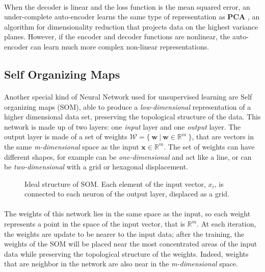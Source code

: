 \paragraph{}
When the decoder is linear and the loss function is the mean squared error, an under-complete auto-encoder learns the same type of representation as \textbf{PCA} \cite{PCA}, an algorithm for dimensionality reduction that projects data on the highest variance planes. However, if the encoder and decoder functions are nonlinear, the auto-encoder can learn much more complex non-linear representations.

\subsection{Self Organizing Maps}
\label{subsec:som}
\paragraph{}
Another special kind of Neural Network used for unsupervised learning are Self organizing maps \cite{som_paper} (SOM), able to produce a \textit{low-dimensional} representation of a higher dimensional data set, preserving the topological structure of the data. \newline
This network is made up of two layers: one \textit{input} layer and one \textit{output} layer. The output layer is made of a set of weights $\mathcal{W} = \{\ \textbf{w}\ |\ \textbf{w} \in \mathbb{R}^m\ \}$, that are vectors in the same \textit{m-dimensional} space as the input $\textbf{x} \in \mathbb{R}^m$.
The set of weights can have different shapes, for example can be \textit{one-dimensional} and act like a line, or can be \textit{two-dimensional} with a grid or hexagonal displacement.

\begin{figure}[ht]
    \centering
    
    \caption{Ideal structure of SOM. Each element of the input vector, $x_i$, is connected to each neuron of the output layer, displaced as a grid.}
\end{figure}

\paragraph{}
The weights of this network lies in the same space as the input, so each weight represents a point in the space of the input vector, that is $\mathbb{R}^m$. At each iteration, the weights are update to be nearer to the input data; after the training, the weights of the SOM will be placed near the most concentrated areas of the input data while preserving the topological structure of the weights. Indeed, weights that are neighbor in the network are also near in the \textit{m-dimensional} space. 

